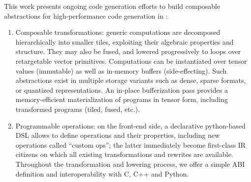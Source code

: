 This work presents ongoing code generation efforts to build composable abstractions for high-performance code generation in \MLIR:
\begin{enumerate}
\item Composable transformations: generic computations are decomposed hierarchically into smaller tiles, exploiting their algebraic properties and structure.
They may also be fused, and lowered progressively to loops over retargetable vector primitives.
Computations can be instantiated over tensor values (immutable) as well as in-memory buffers (side-effecting).
Such abstractions exist in multiple storage variants such as dense, sparse formats, or quantized representations.
An in-place bufferization pass provides a memory-efficient materialization of programs in tensor form, including transformed programs (tiled, fused, etc.).
\item Programmable operations: on the front-end side, a declarative python-based DSL allows to define operations and their properties, including new operations called ``custom ops''; the latter immediately become first-class IR citizens on which all existing transformations and rewrites are available.
Throughout the transformation and lowering process, we offer a simple ABI definition and interoperability with C, C++ and Python.
\end{enumerate}

